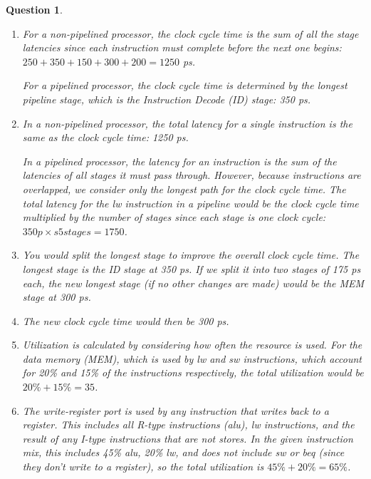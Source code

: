 \documentclass{article}
\theoremstyle{questionstyle}
\newtheorem{q}{Question}
\begin{document}
\begin{q}\begin{enumerate} \leavevmode
    \item For a non-pipelined processor, the clock cycle time is the sum of all the stage latencies since each instruction must complete before the next one begins: $250+350+150+300+200=1250$ ps.
    
    For a pipelined processor, the clock cycle time is determined by the longest pipeline stage, which is the Instruction Decode (ID) stage: 350 ps.
    \item In a non-pipelined processor, the total latency for a single instruction is the same as the clock cycle time: 1250 ps.
    
    In a pipelined processor, the latency for an instruction is the sum of the latencies of all stages it must pass through. However, because instructions are overlapped, we consider only the longest path for the clock cycle time. The total latency for the lw instruction in a pipeline would be the clock cycle time multiplied by the number of stages since each stage is one clock cycle: $350 p \times s5 stages=1750$.

    \item You would split the longest stage to improve the overall clock cycle time. The longest stage is the ID stage at 350 ps. If we split it into two stages of 175 ps each, the new longest stage (if no other changes are made) would be the MEM stage at 300 ps.
    
    \item The new clock cycle time would then be 300 ps.
    \item Utilization is calculated by considering how often the resource is used. For the data memory (MEM), which is used by lw and sw instructions, which account for 20\% and 15\% of the instructions respectively, the total utilization would be $20\%+15\%=35$.
    \item The write-register port is used by any instruction that writes back to a register. This includes all R-type instructions (alu), lw instructions, and the result of any I-type instructions that are not stores. In the given instruction mix, this includes 45\% alu, 20\% lw, and does not include sw or beq (since they don't write to a register), so the total utilization is $45\%+20\%=65\%$.

\end{enumerate}\end{q}
\end{document}
